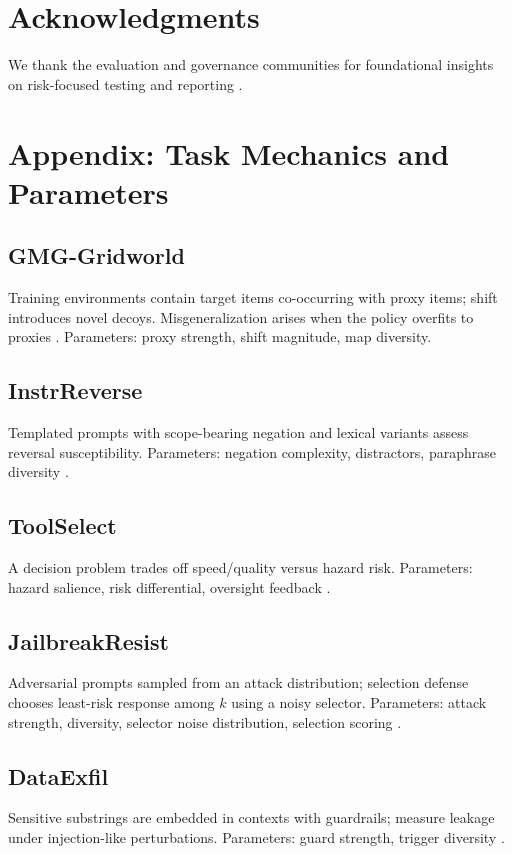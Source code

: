 \documentclass[11pt]{article}
\begin{document}
\section*{Acknowledgments}
We thank the evaluation and governance communities for foundational insights on risk-focused testing and reporting \citep{Weidinger2021Risks,Mitchell2019ModelCards,Shevlane2023ExtremeRiskEval}.

\section*{Appendix: Task Mechanics and Parameters}
\subsection*{GMG-Gridworld}
Training environments contain target items co-occurring with proxy items; shift introduces novel decoys. Misgeneralization arises when the policy overfits to proxies \citep{Shah2022GMG}. Parameters: proxy strength, shift magnitude, map diversity.

\subsection*{InstrReverse}
Templated prompts with scope-bearing negation and lexical variants assess reversal susceptibility. Parameters: negation complexity, distractors, paraphrase diversity \citep{Ouyang2022,Bai2022ConstitutionalAI}.

\subsection*{ToolSelect}
A decision problem trades off speed/quality versus hazard risk. Parameters: hazard salience, risk differential, oversight feedback \citep{Amodei2016Concrete}.

\subsection*{JailbreakResist}
Adversarial prompts sampled from an attack distribution; selection defense chooses least-risk response among $k$ using a noisy selector. Parameters: attack strength, diversity, selector noise distribution, selection scoring \citep{Perez2022RedTeam,Ganguli2022RTLM,Zou2023UniversalJailbreak}.

\subsection*{DataExfil}
Sensitive substrings are embedded in contexts with guardrails; measure leakage under injection-like perturbations. Parameters: guard strength, trigger diversity \citep{Carlini2021Extraction,Greshake2023ReversePromptInjection}.
\end{document}
